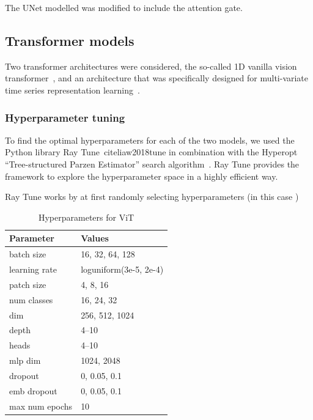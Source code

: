 The UNet modelled was modified to include the attention gate.

\subsection{Transformer models}

Two transformer architectures were considered, the so-called 1D vanilla vision transformer~\cite{Dosovitskiy_2021_ViT,}, and an architecture that was specifically designed for multi-variate time series representation learning~\cite{Zerveas_2020_mvts}.

\subsubsection{Hyperparameter tuning}

To find the optimal hyperparameters for each of the two models, we used the Python library Ray Tune~cite{liaw2018tune} in combination with the Hyperopt \enquote{Tree-structured Parzen Estimator} search algorithm~\cite{Bergstra_Bardenet_Bengio_Kégl_2011}. Ray Tune provides the framework to explore the hyperparameter space in a highly efficient way. 

Ray Tune works by at first randomly selecting hyperparameters (in this case )

\begin{table}[h]
    \centering
    \caption{Hyperparameters for ViT}
    \label{tab:config_parameters}
    \begin{tabular}{@{}ll@{}}
    \toprule
    Parameter       & Values \\ 
    \midrule
    batch size     & 16, 32, 64, 128 \\
    learning rate  & loguniform(3e-5, 2e-4) \\
    patch size     & 4, 8, 16 \\
    num classes    & 16, 24, 32 \\
    dim             & 256, 512, 1024 \\
    depth           & 4--10 \\
    heads           & 4--10 \\
    mlp dim        & 1024, 2048 \\
    dropout         & 0, 0.05, 0.1 \\
    emb dropout    & 0, 0.05, 0.1 \\
    max num epochs & 10  \\ 
    \bottomrule
    \end{tabular}
\end{table}


